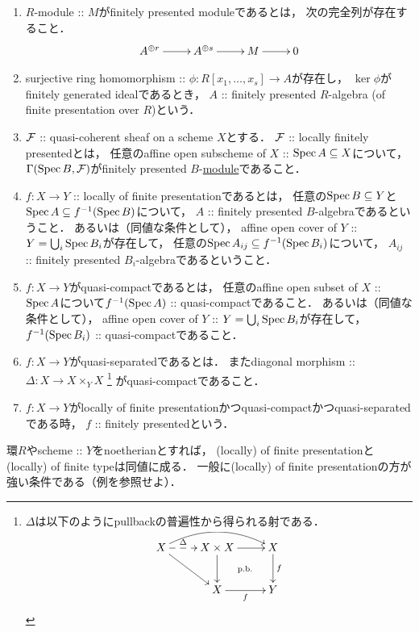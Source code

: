\documentclass[a4paper]{jsarticle}
\begin{document}
\begin{Def}
    \begin{enumerate}[label=(\roman*), leftmargin=*] \hfill \vspace{-0.5cm}
    \item
        $R$-module :: $M$がfinitely presented moduleであるとは，
        次の完全列が存在すること．
        \[\xymatrix{
            A^{\oplus r} \ar[r]& A^{\oplus s} \ar[r]& M \ar[r]& 0
        }\]

    \item
        surjective ring homomorphism :: $\phi \colon R[x_1, \dots, x_s] \to A$が存在し，
        $\ker \phi$がfinitely generated idealであるとき，
        $A$ :: finitely presented $R$-algebra (of finite presentation over $R$)という．

    \item
        $\mathcal{F}$ :: quasi-coherent sheaf on a scheme $X$とする．
        $\mathcal{F}$ :: locally finitely presentedとは，
        任意のaffine open subscheme of $X$ :: $\operatorname{Spec} A \subseteq X$について，
        $\Gamma(\operatorname{Spec} B, \mathcal{F})$がfinitely presented $B$-\underline{module}であること．

    \item
        $f \colon X \to Y$ :: locally of finite presentationであるとは，
        任意の$\operatorname{Spec} B \subseteq Y$と$\operatorname{Spec} A \subseteq f^{-1}(\operatorname{Spec} B)$について，
        $A$ :: finitely presented $B$-algebraであるということ．
        あるいは（同値な条件として），
        affine open cover of $Y$ :: $Y=\bigcup_i \operatorname{Spec} B_i$が存在して，
        任意の$\operatorname{Spec} A_{ij} \subseteq f^{-1}(\operatorname{Spec} B_i)$について，
        $A_{ij}$ :: finitely presented $B_{i}$-algebraであるということ．

    \item
        $f \colon X \to Y$がquasi-compactであるとは，
        任意のaffine open subset of $X$ :: $\operatorname{Spec} A$について$f^{-1}(\operatorname{Spec} A)$ :: quasi-compactであること．
        あるいは（同値な条件として），
        affine open cover of $Y$ :: $Y=\bigcup_i \operatorname{Spec} B_i$が存在して，
        $f^{-1}(\operatorname{Spec} B_i)$ :: quasi-compactであること．
        
    \item
        $f \colon X \to Y$がquasi-separatedであるとは．
        またdiagonal morphism :: $\Delta \colon X \to X \times_{Y} X$
        \footnote
        {
            $\Delta$は以下のようにpullbackの普遍性から得られる射である．
            \[\xymatrix{
                    X \ar@/^5mm/[rr]\ar[rd]\ar@{-->}[r]^-{\Delta}& X \times X \ar[d]\ar[r] & X\ar[d]^-{f} \\
                {}& X\ar[r]_-{f} & Y \ar@{}[lu]|{\text{p.b.}}
            }\]
        }
        がquasi-compactであること．

    \item
        $f \colon X \to Y$がlocally of finite presentationかつquasi-compactかつquasi-separatedである時，
        $f$ :: finitely presentedという．
\end{enumerate}
\end{Def}
環$R$やscheme :: $Y$をnoetherianとすれば，
(locally) of finite presentationと(locally) of finite typeは同値に成る．
一般に(locally) of finite presentationの方が強い条件である（例を参照せよ）．
\end{document}
